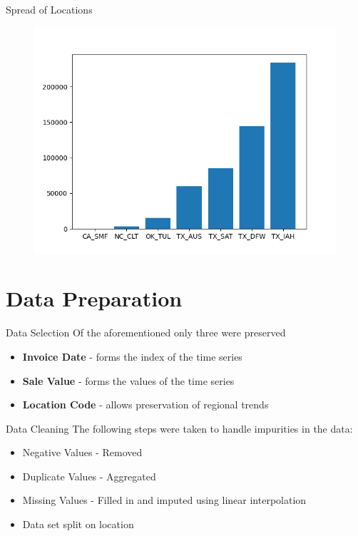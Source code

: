 \documentclass[9pt, dvipsnames]{beamer}
\begin{document}
    \begin{frame}{Spread of Locations}
        \begin{figure}
            \centering
            \includegraphics[height=0.6\paperheight]{assets/locations.png}
            \label{fig:location}
        \end{figure}
    \end{frame}
\section{Data Preparation}
    \begin{frame}{Data Selection}
        Of the aforementioned only three were preserved
        \begin{itemize}
            \item \textbf{Invoice Date} - forms the index of the time series \pause
            \item \textbf{Sale Value} - forms the values of the time series \pause
            \item \textbf{Location Code} - allows preservation of regional
                trends
        \end{itemize}
    \end{frame}
    \begin{frame}{Data Cleaning}
        The following steps were taken to handle impurities in the data: \pause
        \begin{itemize}
            \item Negative Values - Removed \pause
            \item Duplicate Values - Aggregated \pause
            \item Missing Values - Filled in and imputed using linear interpolation \pause
            \item Data set split on location
        \end{itemize}
    \end{frame}
\end{document}
